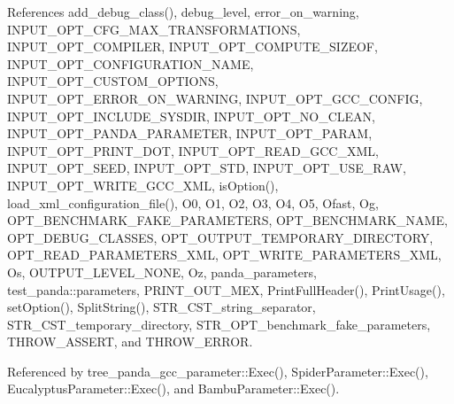References add\+\_\+debug\+\_\+class(), debug\+\_\+level, error\+\_\+on\+\_\+warning, I\+N\+P\+U\+T\+\_\+\+O\+P\+T\+\_\+\+C\+F\+G\+\_\+\+M\+A\+X\+\_\+\+T\+R\+A\+N\+S\+F\+O\+R\+M\+A\+T\+I\+O\+NS, I\+N\+P\+U\+T\+\_\+\+O\+P\+T\+\_\+\+C\+O\+M\+P\+I\+L\+ER, I\+N\+P\+U\+T\+\_\+\+O\+P\+T\+\_\+\+C\+O\+M\+P\+U\+T\+E\+\_\+\+S\+I\+Z\+E\+OF, I\+N\+P\+U\+T\+\_\+\+O\+P\+T\+\_\+\+C\+O\+N\+F\+I\+G\+U\+R\+A\+T\+I\+O\+N\+\_\+\+N\+A\+ME, I\+N\+P\+U\+T\+\_\+\+O\+P\+T\+\_\+\+C\+U\+S\+T\+O\+M\+\_\+\+O\+P\+T\+I\+O\+NS, I\+N\+P\+U\+T\+\_\+\+O\+P\+T\+\_\+\+E\+R\+R\+O\+R\+\_\+\+O\+N\+\_\+\+W\+A\+R\+N\+I\+NG, I\+N\+P\+U\+T\+\_\+\+O\+P\+T\+\_\+\+G\+C\+C\+\_\+\+C\+O\+N\+F\+IG, I\+N\+P\+U\+T\+\_\+\+O\+P\+T\+\_\+\+I\+N\+C\+L\+U\+D\+E\+\_\+\+S\+Y\+S\+D\+IR, I\+N\+P\+U\+T\+\_\+\+O\+P\+T\+\_\+\+N\+O\+\_\+\+C\+L\+E\+AN, I\+N\+P\+U\+T\+\_\+\+O\+P\+T\+\_\+\+P\+A\+N\+D\+A\+\_\+\+P\+A\+R\+A\+M\+E\+T\+ER, I\+N\+P\+U\+T\+\_\+\+O\+P\+T\+\_\+\+P\+A\+R\+AM, I\+N\+P\+U\+T\+\_\+\+O\+P\+T\+\_\+\+P\+R\+I\+N\+T\+\_\+\+D\+OT, I\+N\+P\+U\+T\+\_\+\+O\+P\+T\+\_\+\+R\+E\+A\+D\+\_\+\+G\+C\+C\+\_\+\+X\+ML, I\+N\+P\+U\+T\+\_\+\+O\+P\+T\+\_\+\+S\+E\+ED, I\+N\+P\+U\+T\+\_\+\+O\+P\+T\+\_\+\+S\+TD, I\+N\+P\+U\+T\+\_\+\+O\+P\+T\+\_\+\+U\+S\+E\+\_\+\+R\+AW, I\+N\+P\+U\+T\+\_\+\+O\+P\+T\+\_\+\+W\+R\+I\+T\+E\+\_\+\+G\+C\+C\+\_\+\+X\+ML, is\+Option(), load\+\_\+xml\+\_\+configuration\+\_\+file(), O0, O1, O2, O3, O4, O5, Ofast, Og, O\+P\+T\+\_\+\+B\+E\+N\+C\+H\+M\+A\+R\+K\+\_\+\+F\+A\+K\+E\+\_\+\+P\+A\+R\+A\+M\+E\+T\+E\+RS, O\+P\+T\+\_\+\+B\+E\+N\+C\+H\+M\+A\+R\+K\+\_\+\+N\+A\+ME, O\+P\+T\+\_\+\+D\+E\+B\+U\+G\+\_\+\+C\+L\+A\+S\+S\+ES, O\+P\+T\+\_\+\+O\+U\+T\+P\+U\+T\+\_\+\+T\+E\+M\+P\+O\+R\+A\+R\+Y\+\_\+\+D\+I\+R\+E\+C\+T\+O\+RY, O\+P\+T\+\_\+\+R\+E\+A\+D\+\_\+\+P\+A\+R\+A\+M\+E\+T\+E\+R\+S\+\_\+\+X\+ML, O\+P\+T\+\_\+\+W\+R\+I\+T\+E\+\_\+\+P\+A\+R\+A\+M\+E\+T\+E\+R\+S\+\_\+\+X\+ML, Os, O\+U\+T\+P\+U\+T\+\_\+\+L\+E\+V\+E\+L\+\_\+\+N\+O\+NE, Oz, panda\+\_\+parameters, test\+\_\+panda\+::parameters, P\+R\+I\+N\+T\+\_\+\+O\+U\+T\+\_\+\+M\+EX, Print\+Full\+Header(), Print\+Usage(), set\+Option(), Split\+String(), S\+T\+R\+\_\+\+C\+S\+T\+\_\+string\+\_\+separator, S\+T\+R\+\_\+\+C\+S\+T\+\_\+temporary\+\_\+directory, S\+T\+R\+\_\+\+O\+P\+T\+\_\+benchmark\+\_\+fake\+\_\+parameters, T\+H\+R\+O\+W\+\_\+\+A\+S\+S\+E\+RT, and T\+H\+R\+O\+W\+\_\+\+E\+R\+R\+OR.



Referenced by tree\+\_\+panda\+\_\+gcc\+\_\+parameter\+::\+Exec(), Spider\+Parameter\+::\+Exec(), Eucalyptus\+Parameter\+::\+Exec(), and Bambu\+Parameter\+::\+Exec().

